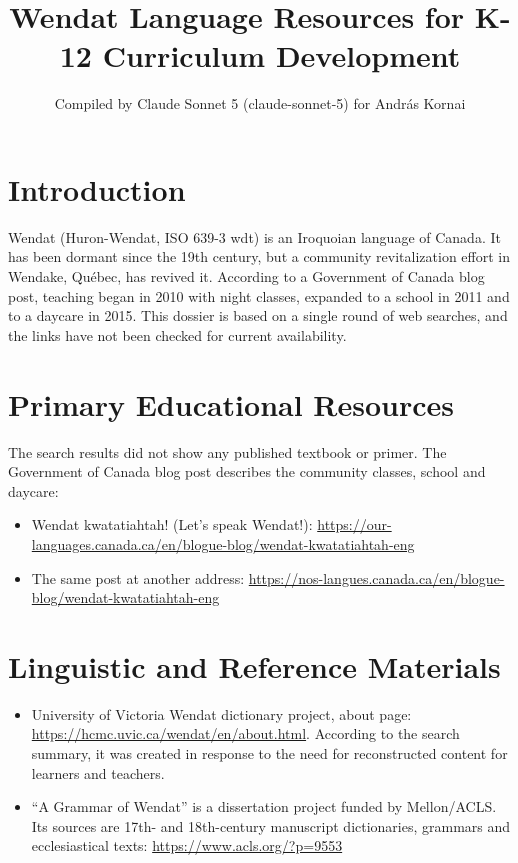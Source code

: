 \documentclass[12pt]{article}
\title{Wendat Language Resources for K-12 Curriculum Development}
\author{Compiled by Claude Sonnet 5 (claude-sonnet-5) for Andr\'as Kornai}
\date{}
\begin{document}
\maketitle

\section{Introduction}
Wendat (Huron-Wendat, ISO 639-3 wdt) is an Iroquoian language of Canada. It has been dormant since the 19th century, but a community revitalization effort in Wendake, Qu\'ebec, has revived it. According to a Government of Canada blog post, teaching began in 2010 with night classes, expanded to a school in 2011 and to a daycare in 2015. This dossier is based on a single round of web searches, and the links have not been checked for current availability.

\section{Primary Educational Resources}
The search results did not show any published textbook or primer. The Government of Canada blog post describes the community classes, school and daycare:
\begin{itemize}
\item Wendat kwatatiahtah! (Let's speak Wendat!): \url{https://our-languages.canada.ca/en/blogue-blog/wendat-kwatatiahtah-eng}
\item The same post at another address: \url{https://nos-langues.canada.ca/en/blogue-blog/wendat-kwatatiahtah-eng}
\end{itemize}

\section{Linguistic and Reference Materials}
\begin{itemize}
\item University of Victoria Wendat dictionary project, about page: \url{https://hcmc.uvic.ca/wendat/en/about.html}. According to the search summary, it was created in response to the need for reconstructed content for learners and teachers.
\item ``A Grammar of Wendat'' is a dissertation project funded by Mellon/ACLS. Its sources are 17th- and 18th-century manuscript dictionaries, grammars and ecclesiastical texts: \url{https://www.acls.org/?p=9553}
\end{itemize}
\end{document}
